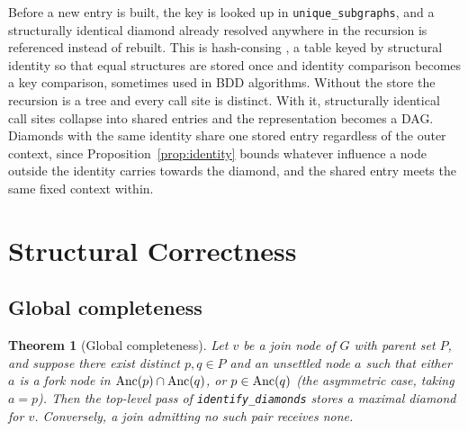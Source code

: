 \documentclass[12pt]{report}
\newtheorem{theorem}{Theorem}
\begin{document}
Before a new entry is built, the key is looked up in \texttt{unique\_subgraphs}, and a structurally identical diamond already resolved anywhere in the recursion is referenced instead of rebuilt. This is hash-consing \cite{ershov1958programming,filliatre2006hashconsing}, a table keyed by structural identity so that equal structures are stored once and identity comparison becomes a key comparison, sometimes used in BDD algorithms. Without the store the recursion is a tree and every call site is distinct. With it, structurally identical call sites collapse into shared entries and the representation becomes a DAG. Diamonds with the same identity share one stored entry regardless of the outer context, since Proposition~\ref{prop:identity} bounds whatever influence a node outside the identity carries towards the diamond, and the shared entry meets the same fixed context within.

\section{Structural Correctness}
\label{sec:dd-correctness}

\subsection{Global completeness}

\begin{theorem}[Global completeness]
\label{thm:completeness}
Let $v$ be a join node of $G$ with parent set $P$, and suppose there exist distinct $p, q \in P$ and an unsettled node $a$ such that either $a$ is a fork node in $\mathrm{Anc}(p)\cap\mathrm{Anc}(q)$, or $p \in \mathrm{Anc}(q)$ (the asymmetric case, taking $a = p$). Then the top-level pass of \texttt{identify\_diamonds} stores a maximal diamond for $v$. Conversely, a join admitting no such pair receives none.
\end{theorem}
\end{document}
